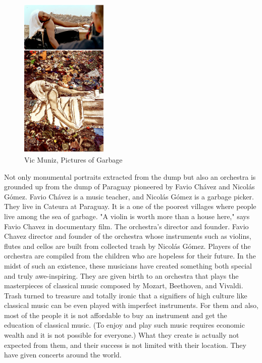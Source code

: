 \begin{figure}
  \begin{center}
    \includegraphics[width=0.37\textwidth]{graphics/vik-muniz-picturesofgarbage0.jpg}
  \end{center}
  \caption{Vic Muniz, Pictures of Garbage}
  \label{fig:VicMuniz_PicturesOfGarbage}
\end{figure}

Not only monumental portraits extracted from the dump but also an orchestra is grounded up from the dump of Paraguay pioneered by Favio Chávez and Nicolás Gómez. Favio Chávez is a music teacher, and Nicolás Gómez is a garbage picker. They live in Cateura at Paraguay. It is a one of the poorest villages where people live among the sea of garbage. "A violin is worth more than a house here," says Favio Chavez in documentary film. The orchestra's director and founder. Favio Chavez director and founder of the orchestra whose instruments such as violins, flutes and cellos are built from collected trash by Nicolás Gómez. Players of the orchestra are compiled from the children who are hopeless for their future. In the midst of such an existence, these musicians have created something both special and truly awe-inspiring. They are given birth to an orchestra that plays the masterpieces of classical music composed by Mozart, Beethoven, and Vivaldi. Trash turned to treasure and totally ironic that a signifiers of high culture like classical music can be even played with imperfect instruments. For them and also, most of the people it is not affordable to buy an instrument and get the education of classical music. (To enjoy and play such music requires economic wealth and it is not possible for everyone.) What they create is actually not expected from them, and their success is not limited with their location. They have given concerts around the world. 

